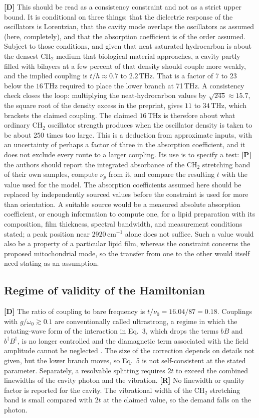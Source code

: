 \documentclass[11pt]{article}
\newcommand{\stR}{\textbf{\textcolor{blue!55!black}{[R]}}}
\newcommand{\stD}{\textbf{\textcolor{green!40!black}{[D]}}}
\newcommand{\stP}{\textbf{\textcolor{violet!80!black}{[P]}}}
\newcommand{\thz}{\,\mathrm{THz}}
\newcommand{\cmi}{\,\mathrm{cm^{-1}}}
\theoremstyle{plain}
\theoremstyle{definition}
\theoremstyle{remark}
\begin{document}
\stD{} This should be read as a consistency constraint and not as a strict upper bound. It is conditional on three things: that the dielectric response of the oscillators is Lorentzian, that the cavity mode overlaps the oscillators as assumed (here, completely), and that the absorption coefficient is of the order assumed. Subject to those conditions, and given that neat saturated hydrocarbon is about the densest CH$_2$ medium that biological material approaches, a cavity partly filled with bilayers at a few percent of that density should couple more weakly, and the implied coupling is $t/h\approx0.7$ to $2.2\thz$. That is a factor of 7 to 23 below the $16\thz$ required to place the lower branch at 71\,THz. A consistency check closes the loop: multiplying the neat-hydrocarbon values by $\sqrt{245}\approx15.7$, the square root of the density excess in the preprint, gives $11$ to $34\thz$, which brackets the claimed coupling. The claimed $16\thz$ is therefore about what ordinary CH$_2$ oscillator strength produces when the oscillator density is taken to be about 250 times too large. This is a deduction from approximate inputs, with an uncertainty of perhaps a factor of three in the absorption coefficient, and it does not exclude every route to a larger coupling. Its use is to specify a test: \stP{} the authors should report the integrated absorbance of the CH$_2$ stretching band of their own samples, compute $\nu_p$ from it, and compare the resulting $t$ with the value used for the model. The absorption coefficients assumed here should be replaced by independently sourced values before the constraint is used for more than orientation. A suitable source would be a measured absolute absorption coefficient, or enough information to compute one, for a lipid preparation with its composition, film thickness, spectral bandwidth, and measurement conditions stated; a peak position near $2920\cmi$ alone does not suffice. Such a value would also be a property of a particular lipid film, whereas the constraint concerns the proposed mitochondrial mode, so the transfer from one to the other would itself need stating as an assumption.

\subsection{Regime of validity of the Hamiltonian}

\stD{} The ratio of coupling to bare frequency is $t/\nu_0=16.04/87=0.18$. Couplings with $g/\omega_0\gtrsim0.1$ are conventionally called ultrastrong, a regime in which the rotating-wave form of the interaction in Eq.~3, which drops the terms $bB$ and $b^\dagger B^\dagger$, is no longer controlled and the diamagnetic term associated with the field amplitude cannot be neglected \cite{kockum2019,forndiaz2019}. The size of the correction depends on details not given, but the lower branch moves, so Eq.~5 is not self-consistent at the stated parameter. Separately, a resolvable splitting requires $2t$ to exceed the combined linewidths of the cavity photon and the vibration. \stR{} No linewidth or quality factor is reported for the cavity. The vibrational width of the CH$_2$ stretching band is small compared with $2t$ at the claimed value, so the demand falls on the photon.
\end{document}

